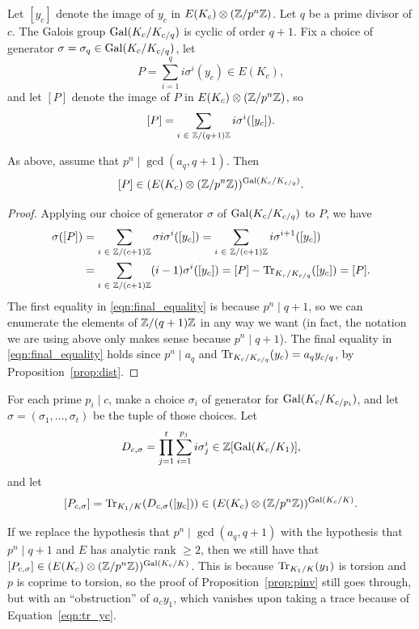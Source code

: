 \documentclass{article} \usepackage[active]{srcltx}
\begin{document}
Let $[y_c]$ denote the image of $y_c$ in $E(K_c)\otimes (\mathbb{Z}/p^n\mathbb{Z})$.  
Let $q$ be a prime divisor of $c$. The Galois group
$\operatorname{Gal}(K_c/K_{c/q})$ is cyclic of order $q+1$.  Fix a choice of generator
$\sigma=\sigma_q \in \operatorname{Gal}(K_c/K_{c/q})$, let
$$
 P = \sum_{i=1}^{q} i \sigma^i(y_c) \in E(K_{c}),
$$
and let $[P]$ denote the image of $P$ in $E(K_c)\otimes (\mathbb{Z}/p^n\mathbb{Z})$, so
\begin{equation}\label{eqn:bracketP}
 [P] = \sum_{i\,\,\in\,\, \mathbb{Z}/(q+1)\mathbb{Z}} i \sigma^i([y_c]).
\end{equation}
\begin{proposition}\label{prop:pinv} 
As above, assume that $p^n \mid \gcd(a_q, q+1)$. Then
$$
[P] \in (E(K_c)\otimes (\mathbb{Z}/p^n\mathbb{Z}))^{\operatorname{Gal}(K_c/K_{c/q})}.
$$
\end{proposition}
\begin{proof} 
Applying our choice of generator $\sigma$ of $\operatorname{Gal}(K_c/K_{c/q})$ to $P$,
we have
\begin{align} \sigma ([P]) &= \sum_{i\,\,\in\,\, \mathbb{Z}/(c+1)\mathbb{Z}} \sigma i
\sigma^i([y_c]) = \sum_{i \,\,\in\,\, \mathbb{Z}/(c+1)\mathbb{Z}} i \sigma^{i+1}
([y_c])\\ &= \sum_{i \,\,\in\,\, \mathbb{Z}/(c+1)\mathbb{Z}} (i-1) \sigma^{i} ([y_c])
= [P] - \operatorname{Tr}_{K_c/K_{c/q}}([y_c]) = [P].\label{eqn:final_equality}
\end{align} The first equality in \eqref{eqn:final_equality} is because
$p^n\mid q+1$, so we can enumerate the elements of $\mathbb{Z}/(q+1)\mathbb{Z}$ in any
way we want (in fact, the notation we are using above only makes sense
because $p^n \mid q+1$).  The final equality in
\eqref{eqn:final_equality} holds since $p^n \mid a_q$ and
$\operatorname{Tr}_{K_c/K_{c/q}}(y_c) = a_q y_{c/q}$, by Proposition~\ref{prop:dist}.
\end{proof}

For each prime $p_i \mid c$, make a choice $\sigma_i$ of generator
for $\operatorname{Gal}(K_c/K_{c/p_i})$, and let $\sigma=(\sigma_1,\ldots,\sigma_t)$
be the tuple of those choices. 
Let
$$
D_{c,\sigma} = \prod_{j=1}^{t} \sum_{i=1}^{p_j} i \sigma_j^i \in \mathbb{Z}[\operatorname{Gal}(K_c/K_1)],
$$
and let
\begin{equation}\label{eqn:pcsigma}
[P_{c,\sigma}] = \operatorname{Tr}_{K_1/K}(D_{c,\sigma}([y_c])) \in (E(K_c)\otimes (\mathbb{Z}/p^n\mathbb{Z}))^{\operatorname{Gal}(K_c/K)}.
\end{equation}

\begin{remark}\label{rmk:althypo}
  If we replace the hypothesis that $p^n \mid \gcd(a_q,q+1)$ with the
  hypothesis that $p^n \mid q+1$ and $E$ has analytic rank $\geq 2$, then
  we still have that $[P_{c,\sigma}] \in (E(K_c)\otimes
  (\mathbb{Z}/p^n\mathbb{Z}))^{\operatorname{Gal}(K_c/K)}$.  This is because $\operatorname{Tr}_{K_1/K}(y_1)$ is
  torsion and $p$ is coprime to torsion, so the proof of
  Proposition~\ref{prop:pinv} still goes through, but with an
  ``obstruction'' of $a_c y_1$, which vanishes upon taking a trace 
because of Equation~\eqref{eqn:tr_yc}.
\end{remark}
\end{document}
